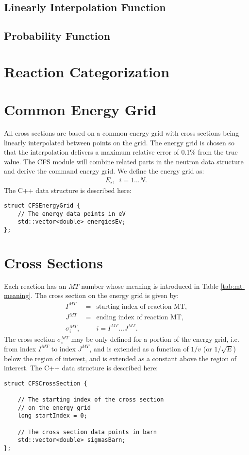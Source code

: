 \subsection{Linearly Interpolation Function}


\subsection{Probability Function}



\section{Reaction Categorization}

\section{Common Energy Grid}
All cross sections are based on a common energy grid with cross sections being linearly interpolated between points on the grid. The energy grid is chosen so that the interpolation delivers a maximum relative error of 0.1\% from the true value. The CFS module will combine related parts in the neutron data structure and derive the command energy grid. We define the energy grid as:
\begin{eqnarray}
E_i,\;\; i=1\dots N.
\end{eqnarray}
The C++ data structure is described here:
\begin{verbatim}
struct CFSEnergyGrid {
    // The energy data points in eV
    std::vector<double> energiesEv;
};
\end{verbatim}

\section{Cross Sections}
Each reaction has an $MT$ number whose meaning is introduced in Table \ref{tab:mt-meaning}. The cross section on the energy grid is given by:
\begin{eqnarray}
I^{MT} &=& \mbox{starting index of reaction MT},\\[1ex]
J^{MT} &=& \mbox{ending index of reaction MT},\\[1ex]
\sigma_i^{MT}, && i=I^{MT}\dots J^{MT}.
\end{eqnarray}
The cross section $\sigma_i^{MT}$ may be only defined for a portion of the energy grid, i.e. from index $I^{MT}$ to index $J^{MT}$, and is extended as a function of $1/v$ (or $1/\sqrt{E}$) below the region of interest, and is extended as a constant above the region of interest. The C++ data structure is described here:
\begin{verbatim}
struct CFSCrossSection {
    
    // The starting index of the cross section 
    // on the energy grid
    long startIndex = 0;
    
    // The cross section data points in barn
    std::vector<double> sigmasBarn;
};
\end{verbatim}


